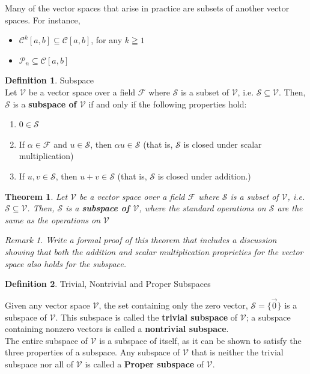 \documentclass{book}
\newtheorem{theorem}{Theorem}[section]
\theoremstyle{definition}
\newtheorem{definition}{Definition}[section]
\theoremstyle{remark}
\newtheorem{remark}{Remark}
\newcommand{\cc}[1]{\mathcal{#1}}
\begin{document}
Many of the vector spaces that arise in practice are subsets of another vector spaces. For instance, 
    \begin{itemize}
        \item $\mathcal{C}^k[a,b] \subseteq \mathcal{C}[a,b]$, for any $k \geqq 1$
        \item $\mathcal{P}_n \subseteq \mathcal{C}[a,b]$
    \end{itemize}

\begin{definition}
Subspace \\

    Let $\cc{V}$ be a vector space over a field $\cc{F}$ where $\cc{S}$ is a subset of $\cc{V}$, i.e. $\cc{S} \subseteq \cc{V}$. Then, $\cc{S}$ is a \textbf{subspace of $\cc{V}$} if and only if the following properties hold: 
        \begin{enumerate}
            \item $0 \in \cc{S}$
            \item If $\alpha \in \cc{F}$ and $u \in \cc{S}$, then $\alpha u \in \cc{S}$ (that is, $\cc{S}$ is closed under scalar multiplication)
            \item If $u, v \in \cc{S}$, then $u+v \in \cc{S}$ (that is, $\cc{S}$ is closed under addition.)
        \end{enumerate}
\end{definition}

\begin{tcolorbox}
    \begin{theorem}
        Let $\cc{V}$ be a vector space over a field $\cc{F}$ where $\cc{S}$ is a subset of $\cc{V}$, i.e. $\cc{S} \subseteq \cc{V}$. Then, $\cc{S}$ is a \textbf{subspace of $\cc{V}$}, where the standard operations on $\cc{S}$ are the same as the operations on $\cc{V}$
        
        \begin{remark}
            Write a formal proof of this theorem that includes a discussion showing that both the addition and scalar multiplication proprieties for the vector space also holds for the subspace.   
        \end{remark}
    \end{theorem}
\end{tcolorbox}

\begin{definition}
Trivial, Nontrivial and Proper Subspaces

    Given any vector space $\cc{V}$, the set containing only the zero vector, $\cc{S} = \{ \vec{0} \}$ is a subspace of $\cc{V}$. This subspace is called the \textbf{trivial subspace} of $\cc{V}$; a subspace containing nonzero vectors is called a \textbf{nontrivial subspace}. \\
    
    The entire subspace of $\cc{V}$ is a subspace of itself, as it can be shown to satisfy the three properties of a subspace. Any subspace of $\cc{V}$ that is neither the trivial subspace nor all of $\cc{V}$ is called a \textbf{Proper subspace}  of $\cc{V}$. 
\end{definition}
\end{document}
